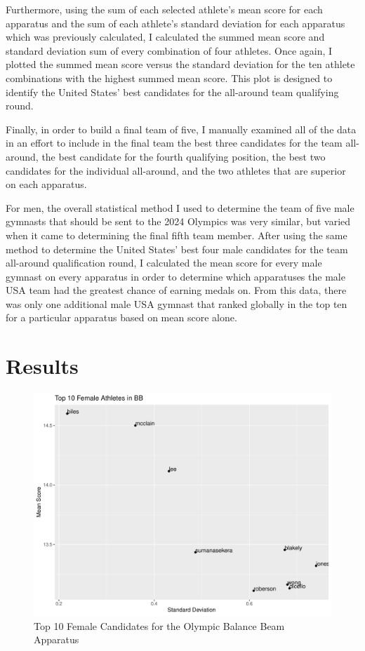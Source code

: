 \documentclass[12pt]{article}
\begin{document}
Furthermore, using the sum of each selected athlete's mean score for each apparatus and the sum of each athlete's standard 
deviation for each apparatus which was previously calculated, I calculated the summed mean score and standard deviation sum 
of every combination of four athletes. Once again, I plotted the summed mean score versus the standard deviation for the ten 
athlete combinations with the highest summed mean score. This plot is designed to identify the United States' best 
candidates for the all-around team qualifying round.

Finally, in order to build a final team of five, I manually examined all of the data in an effort to include in 
the final team the best three candidates for the team all-around, the best candidate for the fourth qualifying position, 
the best two candidates for the individual all-around, and the two athletes that are superior on each apparatus.

For men, the overall statistical method I used to determine the team of five male gymnasts that should be sent 
to the 2024 Olympics was very similar, but varied when it came to determining the final fifth team member. After 
using the same method to determine the United States' best four male candidates for the team all-around qualification 
round, I calculated the mean score for every male gymnast on every apparatus in order to determine which apparatuses 
the male USA team had the greatest chance of earning medals on. From this data, there was only one additional male 
USA gymnast that ranked globally in the top ten for a particular apparatus based on mean score alone.

\section{Results}
\label{sec:res}

\begin{figure}
  \centering
  \includegraphics[scale=0.6]{FemaleAthletesBB.pdf}
  \caption{Top 10 Female Candidates for the Olympic Balance Beam Apparatus}
  \label{fig:BB}
\end{figure}
\end{document}
